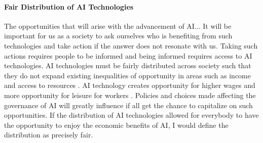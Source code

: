 \documentclass[12pt]{article}
\begin{document}
\paragraph{Fair Distribution of AI Technologies\\}
The opportunities that will arise with the advancement of AI... It will be important for us as a society to ask ourselves who is benefiting from such technologies and take action if the answer does not resonate with us. Taking such actions requires people to be informed and being informed requires access to AI technologies. AI technologies must be fairly distributed across society such that they do not expand existing inequalities of opportunity in areas such as income and access to resources \cite[pg. 10]{twentythirty}. AI technology creates opportunity for higher wages and more opportunity for leisure for workers \cite[pg. 2]{gov}. Policies and choices made affecting the governance of AI will greatly influence if all get the chance to capitalize on such opportunities. If the distribution of AI technologies allowed for everybody to have the opportunity to enjoy the economic benefits of AI, I would define the distribution as precisely fair. 
\end{document}
